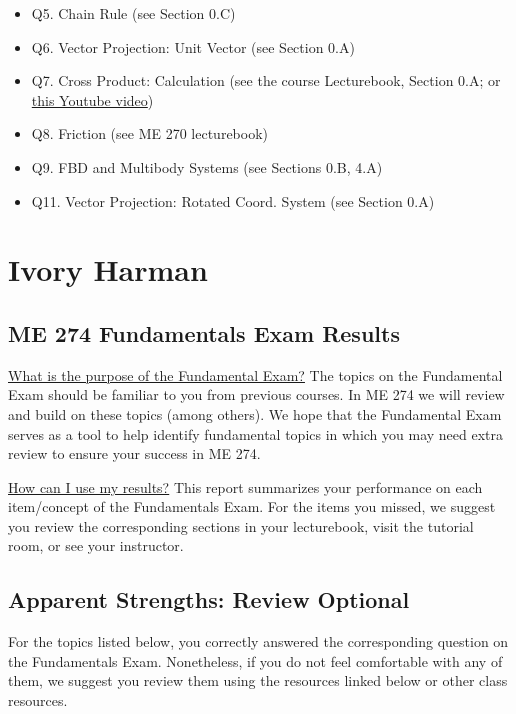 \documentclass[11pt,letterpaper]{article}\usepackage[]{graphicx}\usepackage[]{color}
\begin{document}
\begin{itemize}\item Q5. Chain Rule (see Section 0.C)
\item Q6. Vector Projection: Unit Vector (see Section 0.A)
\item Q7. Cross Product: Calculation (see the course Lecturebook, Section 0.A; or \href{https://www.youtube.com/watch?v=DmPxjmymM7k}{this Youtube video})
\item Q8. Friction (see ME 270 lecturebook)
\item Q9. FBD and Multibody Systems (see Sections 0.B, 4.A)
\item Q11. Vector Projection: Rotated Coord. System (see Section 0.A)
\end{itemize}

\pagebreak
\section*{Ivory Harman}
\subsection*{ME 274 Fundamentals Exam Results}
\underline{What is the purpose of the Fundamental Exam?}  The topics on the Fundamental Exam should be familiar to you from previous courses.  In ME 274 we will review and build on these topics (among others). We hope that the Fundamental Exam serves as a tool to help identify fundamental topics in which you may need extra review to ensure your success in ME 274.\

\underline{How can I use my results?}  This report summarizes your performance on each item/concept of the Fundamentals Exam.  For the items you missed, we suggest you review the corresponding sections in your lecturebook, visit the tutorial room, or see your instructor.

\subsection*{Apparent Strengths: Review Optional}
For the topics listed below, you correctly answered the corresponding question on the Fundamentals Exam.  Nonetheless, if you do not feel comfortable with any of them, we suggest you review them using the resources linked below or other class resources.
\end{document}
